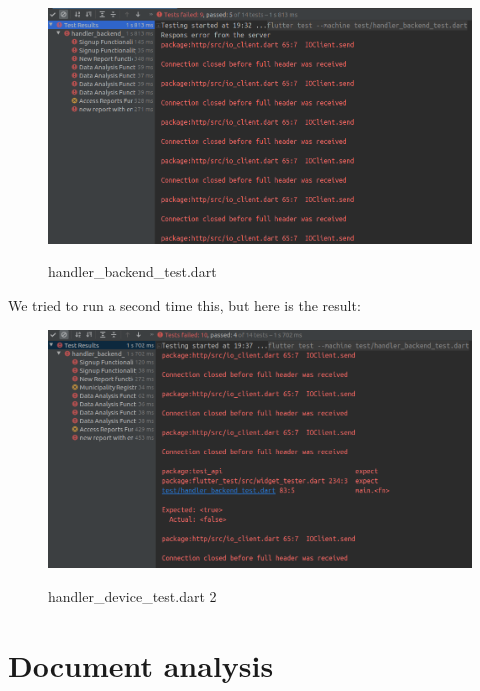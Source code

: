 \documentclass[../ATD.tex]{subfiles}
\begin{document}
    \begin{figure}[H]
        \centering
        \includegraphics[scale = 0.5]{assets/t7.png}\\
        \caption[handler\_device\_test.dart]{handler\_backend\_test.dart}
    \end{figure}
    We tried to run a second time this, but here is the result:
    \begin{figure}[H]
        \centering
        \includegraphics[scale = 0.5]{assets/t7v2.png}\\
        \caption[handler\_device\_test.dart 2]{handler\_device\_test.dart 2}
    \end{figure}


    \section{Document analysis}\label{sec:document-analysis}
\end{document}
